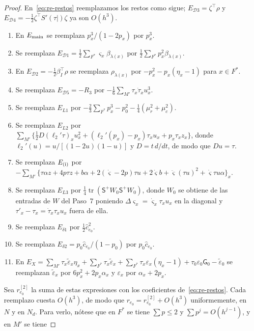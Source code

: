 \begin{proof}
En~\eqref{eq:re-restos} reemplazamos los restos como sigue; $E_{\mathcal D3}=\zeta^\top\rho$ y
$E_{\mathcal D4}=-\tfrac12\zeta^\top S'(\tau|)\zeta$ ya son $O(h^3)$.
\begin{enumerate}
\item En $E_{\rm main}$ se reemplaza $p_x^3/(1-2p_x)$ por $p_x^3$.
\item Se reemplaza $E_{\mathcal D1}=\tfrac12\sum_{F^*}\varsigma_x\beta_{\lambda(x)}$ por
$\tfrac12\sum_{F^*}p_x^2\beta_{\lambda(x)}$.
\item En $E_{\mathcal D2}=-\tfrac12\beta_I^\top\rho$ se reemplaza $\rho_{\lambda(x)}$ por
$-p_x^2-p_x(\eta_x-1)$ para $x\in F^*$.
\item Se reemplaza $E_{\mathcal D5}=-R_3$ por $-\tfrac16\sum_{M'}\tau_x\dot\tau_xu_x^3$.
\item Se reemplaza $E_{L1}$ por $-\tfrac23\sum_{F^*}p_x^3-p_0^2-\tfrac14(\mu_r^2+\mu_c^2)$.
\item Se reemplaza $E_{L2}$ por $\sum_{M'}\bigl\{\tfrac12D(\ell_2'\tau)_xu_x^2
+(\ell_2'(p_x)-p_x)\tau_xu_x+p_x\tau_xz_x\bigr\}$, donde $\ell_2'(u)=u/[(1-2u)(1-u)]$ y
$D=t\,d/dt$, de modo que $Du=\tau$.
\item Se reemplaza $E_{\rm(i)}$ por $-\sum_{M'}\bigl\{\tau\alpha z+4p\tau z+b\alpha
+2(\dot\varsigma-2p)\tau u+2\dot\varsigma b+\ddot\varsigma(\tau u)^2+\dot\varsigma\tau u\alpha\bigr\}_x$.
\item Se reemplaza $E_{L3}$ por $\tfrac14\operatorname{tr}(\mathsf S^+W_0\mathsf S^+W_0)$, donde $W_0$
se obtiene de las entradas de $W$ del Paso~7 poniendo $\Delta\varsigma_x=\dot\varsigma_x\tau_xu_x$ en
la diagonal y $\tau'_x-\tau_x=\dot\tau_x\tau_xu_x$ fuera de ella.
\item Se reemplaza $E_{\delta1}$ por $\tfrac12\hat c_{e_0}^2$.
\item Se reemplaza $E_{\delta2}=p_0\hat c_{e_0}/(1-p_0)$ por $p_0\hat c_{e_0}$.
\item En
$E_X=\sum_{M'}\tau_x\tilde\varepsilon_x\eta_x+\sum_{F^*}\tau_x\tilde\varepsilon_x
+\sum_{F^*}\tau_x\varepsilon_x(\eta_x-1)+\tau_0\varepsilon_0\mathsf G_0-\tilde\varepsilon_0$ se
reemplazan $\tilde\varepsilon_x$ por $6p_x^2+2p_x\alpha_x$ y $\varepsilon_x$ por $\alpha_x+2p_x$.
\end{enumerate}
Sea $r^{[2]}_{e_0}$ la suma de estas expresiones con los coeficientes de~\eqref{eq:re-restos}. Cada
reemplazo cuesta $O(h^3)$, de modo que $r_{e_0}=r^{[2]}_{e_0}+O(h^3)$ uniformemente, en $N$ y en $N_d$.
Para verlo, nótese que en $F^*$ se tiene $\sum p\le2$ y $\sum p^j=O(h^{j-1})$, y en $M'$ se tiene

\end{proof}
